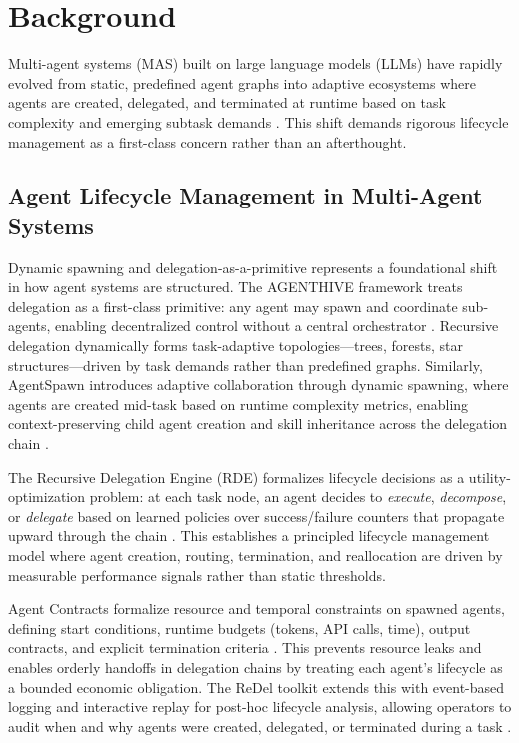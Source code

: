 \section{Background}

Multi-agent systems (MAS) built on large language models (LLMs) have rapidly evolved from static, predefined agent graphs into adaptive ecosystems where agents are created, delegated, and terminated at runtime based on task complexity and emerging subtask demands \cite{agenthive2025, agentspawn2026, redel2024}. This shift demands rigorous lifecycle management as a first-class concern rather than an afterthought.

\subsection{Agent Lifecycle Management in Multi-Agent Systems}

Dynamic spawning and delegation-as-a-primitive represents a foundational shift in how agent systems are structured. The AGENTHIVE framework treats delegation as a first-class primitive: any agent may spawn and coordinate sub-agents, enabling decentralized control without a central orchestrator \cite{agenthive2025}. Recursive delegation dynamically forms task-adaptive topologies---trees, forests, star structures---driven by task demands rather than predefined graphs. Similarly, AgentSpawn introduces adaptive collaboration through dynamic spawning, where agents are created mid-task based on runtime complexity metrics, enabling context-preserving child agent creation and skill inheritance across the delegation chain \cite{agentspawn2026}.

The Recursive Delegation Engine (RDE) formalizes lifecycle decisions as a utility-optimization problem: at each task node, an agent decides to \textit{execute}, \textit{decompose}, or \textit{delegate} based on learned policies over success/failure counters that propagate upward through the chain \cite{rde2024}. This establishes a principled lifecycle management model where agent creation, routing, termination, and reallocation are driven by measurable performance signals rather than static thresholds.

Agent Contracts formalize resource and temporal constraints on spawned agents, defining start conditions, runtime budgets (tokens, API calls, time), output contracts, and explicit termination criteria \cite{agentcontracts2025}. This prevents resource leaks and enables orderly handoffs in delegation chains by treating each agent's lifecycle as a bounded economic obligation. The ReDel toolkit extends this with event-based logging and interactive replay for post-hoc lifecycle analysis, allowing operators to audit when and why agents were created, delegated, or terminated during a task \cite{redel2024}.

